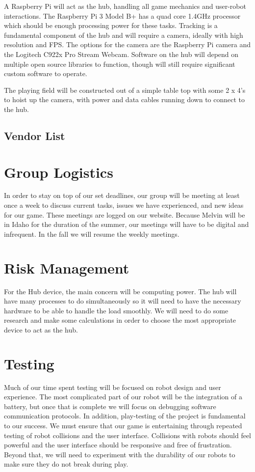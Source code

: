 \documentclass[11pt]{ieeeconf}
\begin{document}
A Raspberry Pi will act as the hub, handling all game mechanics and user-robot interactions. The Raspberry Pi 3 Model B+ has a quad core 1.4GHz processor which should be enough processing power for these tasks. Tracking is a fundamental component of the hub and will require a camera, ideally with high resolution and FPS. The options for the camera are the Raspberry Pi camera and the Logitech C922x Pro Stream Webcam. Software on the hub will depend on multiple open source libraries to function, though will still require significant custom software to operate.

The playing field will be constructed out of a simple table top with some 2 x 4's to hoist up the camera, with power and data cables running down to connect to the hub.

\subsection{Vendor List}

\section{Group Logistics}
In order to stay on top of our set deadlines, our group will be meeting at least once a week to discuss current tasks, issues we have experienced, and new ideas for our game. These meetings are logged on our website. Because Melvin will be in Idaho for the duration of the summer, our meetings will have to be digital and infrequent. In the fall we will resume the weekly meetings.

\section{Risk Management}
For the Hub device, the main concern will be computing power. The hub will have many processes to do simultaneously so it will need to have the necessary hardware to be able to handle the load smoothly. We will need to do some research and make some calculations in order to choose the most appropriate device to act as the hub.

\section{Testing}
Much of our time spent testing will be focused on robot design and user experience. The most complicated part of our robot will be the integration of a battery, but once that is complete we will focus on debugging software communication protocols. In addition, play-testing of the project is fundamental to our success. We must ensure that our game is entertaining through repeated testing of robot collisions and the user interface. Collisions with robots should feel powerful and the user interface should be responsive and free of frustration. Beyond that, we will need to experiment with the durability of our robots to make sure they do not break during play.
\end{document}
